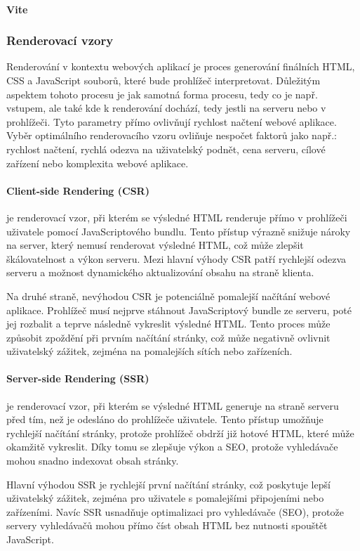 \documentclass[12pt, a4paper]{article}
\begin{document}
\paragraph{Vite}
\subsubsection{Renderovací vzory}
Renderování v kontextu webových aplikací je proces generování finálních HTML, CSS a JavaScript souborů, které bude prohlížeč interpretovat. Důležitým aspektem tohoto procesu je jak samotná forma procesu, tedy co je např. vstupem, ale také kde k renderování dochází, tedy jestli na serveru nebo v prohlížeči. Tyto parametry přímo ovlivňují rychlost načtení webové aplikace. Vyběr optimálního renderovacího vzoru ovliňuje nespočet faktorů jako např.: rychlost načtení, rychlá odezva na uživatelský podnět, cena serveru, cílové zařízení nebo komplexita webové aplikace.
\paragraph{Client-side Rendering (CSR)}
je renderovací vzor, při kterém se výsledné HTML renderuje přímo v prohlížeči uživatele pomocí JavaScriptového bundlu. Tento přístup výrazně snižuje nároky na server, který nemusí renderovat výsledné HTML, což může zlepšit škálovatelnost a výkon serveru. Mezi hlavní výhody CSR patří rychlejší odezva serveru a možnost dynamického aktualizování obsahu na straně klienta.

Na druhé straně, nevýhodou CSR je potenciálně pomalejší načítání webové aplikace. Prohlížeč musí nejprve stáhnout JavaScriptový bundle ze serveru, poté jej rozbalit a teprve následně vykreslit výsledné HTML. Tento proces může způsobit zpoždění při prvním načítání stránky, což může negativně ovlivnit uživatelský zážitek, zejména na pomalejších sítích nebo zařízeních.
\paragraph{Server-side Rendering (SSR)}
je renderovací vzor, při kterém se výsledné HTML generuje na straně serveru před tím, než je odesláno do prohlížeče uživatele. Tento přístup umožňuje rychlejší načítání stránky, protože prohlížeč obdrží již hotové HTML, které může okamžitě vykreslit. Díky tomu se zlepšuje výkon a SEO, protože vyhledávače mohou snadno indexovat obsah stránky.

Hlavní výhodou SSR je rychlejší první načítání stránky, což poskytuje lepší uživatelský zážitek, zejména pro uživatele s pomalejšími připojeními nebo zařízeními. Navíc SSR usnadňuje optimalizaci pro vyhledávače (SEO), protože servery vyhledávačů mohou přímo číst obsah HTML bez nutnosti spouštět JavaScript.
\end{document}
